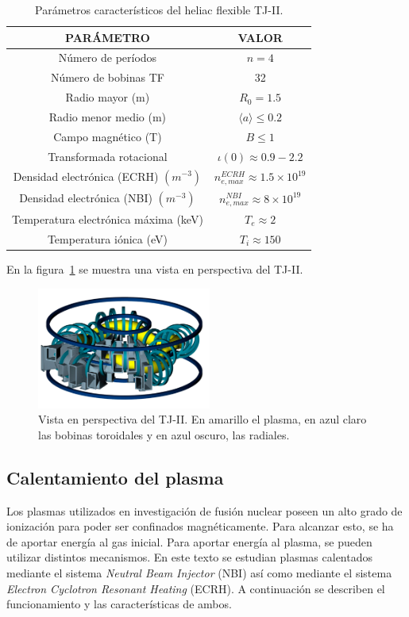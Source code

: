 \begin{table}[H]
    \centering
    \begin{tabular}{cc}
    \hline
    PARÁMETRO & VALOR \\ \hline
    Número de períodos          & $n=4$       \\
    Número de bobinas TF          & 32       \\
    Radio mayor (m)          & $R_0=1.5$      \\
    Radio menor medio (m)          & $\langle a\rangle\leq 0.2$       \\
    Campo magnético (T)          & $B\leq 1$       \\
    Transformada rotacional          & $\iota(0)\approx0.9-2.2$       \\
    Densidad electrónica (ECRH) $(m^{-3})$          & $n^{ECRH}_{e,max}\approx 1.5\times 10^{19}$       \\
    Densidad electrónica (NBI) $(m^{-3})$          & $n^{NBI}_{e,max}\approx 8\times 10^{19}$       \\
    Temperatura electrónica máxima (keV)          & $T_e\approx 2$      \\
    Temperatura iónica (eV)          & $T_i\approx 150$      \\ \hline
    \end{tabular}
    \caption{Parámetros característicos del heliac flexible TJ-II.}
    \label{tab:tj2}
\end{table}
En la figura~\ref{fig:view} se muestra una vista en perspectiva del TJ-II.
\begin{figure}[h!]
    \centering
    \includegraphics[height=4cm]{img/view.png}
    \caption[Vista en perspectiva del TJ-II]{Vista en perspectiva del TJ-II. En amarillo el plasma, en azul claro las bobinas toroidales y en azul oscuro, las radiales.}
    \label{fig:view}
\end{figure}
\subsection{Calentamiento del plasma}
Los plasmas utilizados en investigación de fusión nuclear poseen un alto grado de ionización 
para poder ser confinados magnéticamente. Para alcanzar esto, se ha de aportar energía al
gas inicial.
Para aportar energía al plasma, se pueden utilizar distintos mecanismos. En este texto se estudian
plasmas calentados mediante el sistema \textit{Neutral Beam Injector} (NBI) así como mediante
el sistema \textit{Electron Cyclotron Resonant Heating} (ECRH). A continuación se describen
el funcionamiento y las características de ambos.
